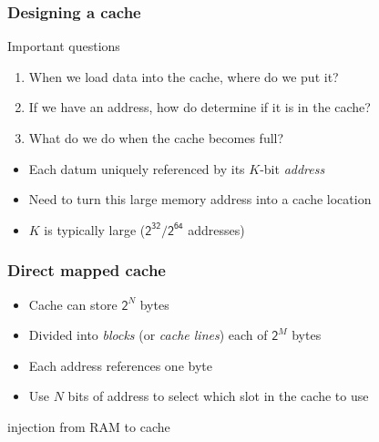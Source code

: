 \documentclass[dvipsnames,presentation,aspectratio=169,14pt]{beamer}
\begin{document}
\begin{frame}
  \frametitle{Designing a cache}
  \begin{block}{Important questions}
    \begin{enumerate}[itemsep=6pt]
    \item When we load data into the cache, where do we put it?
    \item If we have an address, how do determine if it is in the
      cache?
    \item What do we do when the cache becomes full?
    \end{enumerate}
  \end{block}

  \vskip 11pt

  \begin{itemize}[itemsep=4pt]
  \item Each datum uniquely referenced by its $K$-bit \emph{address}
  \item Need to turn this large memory address into a cache location
  \item $K$ is typically large ($\mathsf{2^{32}/2^{64}}$ addresses)
  \end{itemize}
\end{frame}

\begin{frame}
  \frametitle{Direct mapped cache}
  \begin{itemize}[itemsep=7pt]
  \item Cache can store $\mathsf 2^N$ bytes
  \item Divided into \emph{blocks} (or \emph{cache lines}) each of $\mathsf 2^M$ bytes
  \item Each address references one byte
  \item Use $N$ bits of address to select which slot
    in the cache to use
  \end{itemize}

  \vskip 11pt

   injection from RAM to cache
\end{frame}
\end{document}
